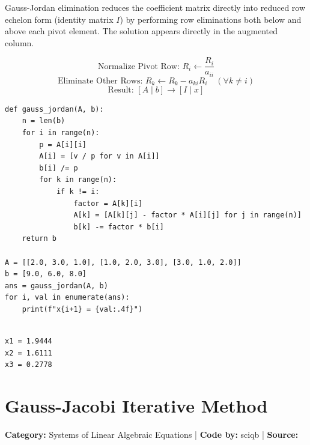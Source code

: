\documentclass[10pt,a4paper]{report}
\begin{document}
Gauss-Jordan elimination reduces the coefficient matrix directly into reduced row echelon form (identity matrix $I$) by performing row eliminations both below and above each pivot element. The solution appears directly in the augmented column.

\begin{tcolorbox}[colback=theorybg,colframe=theoryframe,title=\textbf{Mathematical Theory \& Formulation},boxrule=1pt,arc=2mm]
\[
\text{Normalize Pivot Row: } R_i \leftarrow \frac{R_i}{a_{ii}}
\]
\[
\text{Eliminate Other Rows: } R_k \leftarrow R_k - a_{ki} R_i \quad (\forall k \neq i)
\]
\[
\text{Result: } [A \mid b] \longrightarrow [I \mid x]
\]
\end{tcolorbox}

\begin{tcolorbox}[colback=codebg,colframe=secondary,title=\textbf{Python Implementation (Step-by-Step Functions)},boxrule=1pt,arc=2mm]
\begin{lstlisting}[style=python_detailed]
def gauss_jordan(A, b):
    n = len(b)
    for i in range(n):
        p = A[i][i]
        A[i] = [v / p for v in A[i]]
        b[i] /= p
        for k in range(n):
            if k != i:
                factor = A[k][i]
                A[k] = [A[k][j] - factor * A[i][j] for j in range(n)]
                b[k] -= factor * b[i]
    return b

A = [[2.0, 3.0, 1.0], [1.0, 2.0, 3.0], [3.0, 1.0, 2.0]]
b = [9.0, 6.0, 8.0]
ans = gauss_jordan(A, b)
for i, val in enumerate(ans):
    print(f"x{i+1} = {val:.4f}")


\end{lstlisting}
\end{tcolorbox}

\begin{tcolorbox}[colback=termbg,colframe=primary,title=\textbf{Program Execution Output \& Convergence Table},boxrule=1pt,arc=2mm]
\begin{lstlisting}[style=terminal_output]
x1 = 1.9444
x2 = 1.6111
x3 = 0.2778
\end{lstlisting}
\end{tcolorbox}

\newpage


\section{Gauss-Jacobi Iterative Method}
\textbf{Category:} \textcolor{secondary}{Systems of Linear Algebraic Equations} \quad | \quad \textbf{Code by:} \textcolor{secondary}{sciqb} \quad | \quad \textbf{Source:} \texttt{}
\end{document}
